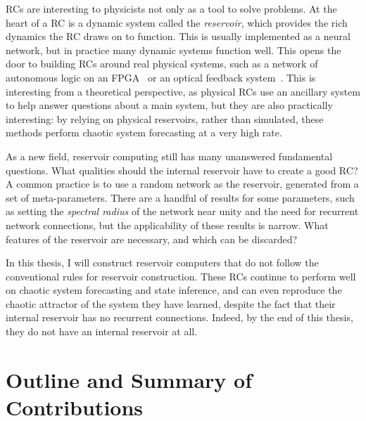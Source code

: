 RCs are interesting to physicists not only as a tool to solve
problems. At the heart of a RC is a dynamic system called the
\emph{reservoir}, which provides the rich dynamics the RC draws on to
function. This is usually implemented as a neural network, but in
practice many dynamic systems function well. This opens the door to
building RCs around real physical systems, such as a network of
autonomous logic on an FPGA~\cite{canaday2018} or an optical feedback
system~\cite{antonik2016}. This is interesting from a theoretical
perspective, as physical RCs use an ancillary system to help answer
questions about a main system, but they are also practically
interesting: by relying on physical reservoirs, rather than simulated,
these methods perform chaotic system forecasting at a very high rate.

As a new field, reservoir computing still has many unanswered
fundamental questions. What qualities should the internal reservoir
have to create a good RC? A common practice is to use a random network
as the reservoir, generated from a set of meta-parameters. There are a
handful of results for some parameters, such as setting the
\emph{spectral radius} of the network near unity and the need for
recurrent network connections,\cite{jaeger2001,lukosevicius2012} but
the applicability of these results is narrow. What features of the
reservoir are necessary, and which can be discarded?

In this thesis, I will construct reservoir computers that do not
follow the conventional rules for reservoir construction. These RCs
continue to perform well on chaotic system forecasting and state
inference, and can even reproduce the chaotic attractor of the system
they have learned, despite the fact that their internal reservoir has
no recurrent connections. Indeed, by the end of this thesis, they do
not have an internal reservoir at all.

\section{Outline and Summary of Contributions}

